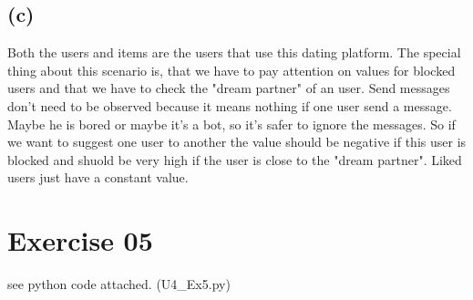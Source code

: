 \documentclass[11pt,a4paper]{scrartcl}
\begin{document}
\subsection*{(c)}

Both the users and items are the users that use this dating platform. The special thing about this scenario is, that we have to pay attention on values for blocked users and that we have to check the "dream partner" of an user. Send messages don't need to be observed because it means nothing if one user send a message. Maybe he is bored or maybe it's a bot, so it's safer to ignore the messages. So if we want to suggest one user to another the value should be negative if this user is blocked and shuold be very high if the user is close to the "dream partner". Liked users just have a constant value.

\section*{Exercise 05}
see python code attached. (U4\_Ex5.py)
\end{document}
